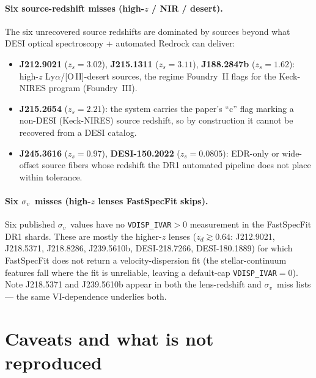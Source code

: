 \documentclass[11pt,letterpaper]{article}
\newcommand{\sigmav}{\ensuremath{\sigma_v}}
\newcommand{\zd}{\ensuremath{z_d}}
\newcommand{\zs}{\ensuremath{z_s}}
\begin{document}
\paragraph{Six source-redshift misses (high-$z$ / NIR / desert).}
The six unrecovered source redshifts are dominated by sources beyond what DESI
optical spectroscopy + automated Redrock can deliver:
\begin{itemize}
\item \textbf{J212.9021} ($\zs=3.02$), \textbf{J215.1311} ($\zs=3.11$),
      \textbf{J188.2847b} ($\zs=1.62$): high-$z$ Ly$\alpha$/[O\,II]-desert
      sources, the regime Foundry~II flags for the Keck-NIRES program
      (Foundry~III).
\item \textbf{J215.2654} ($\zs=2.21$): the system carries the paper's ``c''
      flag marking a non-DESI (Keck-NIRES) source redshift, so by construction
      it cannot be recovered from a DESI catalog.
\item \textbf{J245.3616} ($\zs=0.97$), \textbf{DESI-150.2022} ($\zs=0.0805$):
      EDR-only or wide-offset source fibers whose redshift the DR1 automated
      pipeline does not place within tolerance.
\end{itemize}

\paragraph{Six \sigmav\ misses (high-$z$ lenses FastSpecFit skips).}
Six published \sigmav\ values have no \texttt{VDISP\_IVAR}$>0$ measurement in the
FastSpecFit DR1 shards. These are mostly the higher-$z$ lenses
($\zd\gtrsim0.64$: J212.9021, J218.5371, J218.8286, J239.5610b, DESI-218.7266,
DESI-180.1889) for which FastSpecFit does not return a velocity-dispersion fit
(the stellar-continuum features fall where the fit is unreliable, leaving a
default-cap \texttt{VDISP\_IVAR}$=0$). Note J218.5371 and J239.5610b appear in
both the lens-redshift and \sigmav\ miss lists --- the same VI-dependence
underlies both.

\section{Caveats and what is not reproduced}
\label{sec:caveats}
\end{document}

